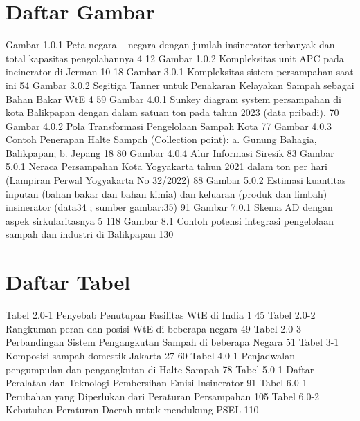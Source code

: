 \documentclass[
  letterpaper,
  DIV=11,
  numbers=noendperiod]{scrreprt}
\begin{document}

\chapter*{Daftar Gambar}\label{daftar-gambar}


Gambar 1.0.1 Peta negara -- negara dengan jumlah insinerator terbanyak
dan total kapasitas pengolahannya 4 12 Gambar 1.0.2 Kompleksitas unit
APC pada incinerator di Jerman 10 18 Gambar 3.0.1 Kompleksitas sistem
persampahan saat ini 54 Gambar 3.0.2 Segitiga Tanner untuk Penakaran
Kelayakan Sampah sebagai Bahan Bakar WtE 4 59 Gambar 4.0.1 Sunkey
diagram system persampahan di kota Balikpapan dengan dalam satuan ton
pada tahun 2023 (data pribadi). 70 Gambar 4.0.2 Pola Transformasi
Pengelolaan Sampah Kota 77 Gambar 4.0.3 Contoh Penerapan Halte Sampah
(Collection point): a. Gunung Bahagia, Balikpapan; b. Jepang 18 80
Gambar 4.0.4 Alur Informasi Siresik 83 Gambar 5.0.1 Neraca Persampahan
Kota Yogyakarta tahun 2021 dalam ton per hari (Lampiran Perwal
Yogyakarta No 32/2022) 88 Gambar 5.0.2 Estimasi kuantitas inputan (bahan
bakar dan bahan kimia) dan keluaran (produk dan limbah) insinerator
(data34 ; sumber gambar:35) 91 Gambar 7.0.1 Skema AD dengan aspek
sirkularitasnya 5 118 Gambar 8.1 Contoh potensi integrasi pengelolaan
sampah dan industri di Balikpapan 130


\chapter*{Daftar Tabel}\label{daftar-tabel}


Tabel 2.0-1 Penyebab Penutupan Fasilitas WtE di India 1 45 Tabel 2.0-2
Rangkuman peran dan posisi WtE di beberapa negara 49 Tabel 2.0-3
Perbandingan Sistem Pengangkutan Sampah di beberapa Negara 51 Tabel 3-1
Komposisi sampah domestik Jakarta 27 60 Tabel 4.0-1 Penjadwalan
pengumpulan dan pengangkutan di Halte Sampah 78 Tabel 5.0-1 Daftar
Peralatan dan Teknologi Pembersihan Emisi Insinerator 91 Tabel 6.0-1
Perubahan yang Diperlukan dari Peraturan Persampahan 105 Tabel 6.0-2
Kebutuhan Peraturan Daerah untuk mendukung PSEL 110

\end{document}
